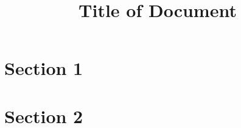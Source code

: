 \documentclass[a4paper,12pt]{article}
\begin{document}
\title{Title of Document}
\author{}
\date{}
\maketitle

\section{Section 1}
\lipsum[1] %

\section{Section 2}
\lipsum[2] %
\end{document}
